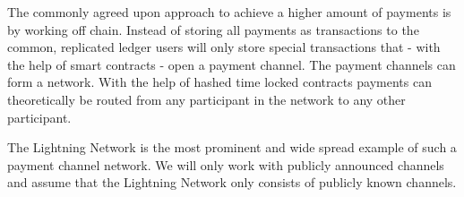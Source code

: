 \documentclass[a4paper]{paper}
\begin{document}
The commonly agreed upon approach to achieve a higher amount of payments is by working off chain.
Instead of storing all payments as transactions to the common, replicated ledger users will only store special transactions that - with the help of smart contracts - open a payment channel.
The payment channels can form a network.
With the help of hashed time locked contracts payments can theoretically be routed from any participant in the network to any other participant. 

The Lightning Network is the most prominent and wide spread example of such a payment channel network.
We will only work with publicly announced channels and assume that the Lightning Network only consists of publicly known channels.


\null\newpage
\begin{minipage}[t]{0.8\linewidth}
  
\end{minipage}
\end{document}
